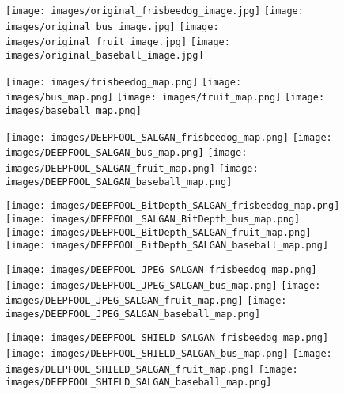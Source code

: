 \documentclass[10pt,twocolumn,letterpaper]{article}
\begin{document}
\begin{figure}[hbt]

\texttt{[image: images/original\_frisbeedog\_image.jpg]}
  \texttt{[image: images/original\_bus\_image.jpg]}
  \texttt{[image: images/original\_fruit\_image.jpg]}
  \texttt{[image: images/original\_baseball\_image.jpg]}
  
\texttt{[image: images/frisbeedog\_map.png]}
  \texttt{[image: images/bus\_map.png]}
  \texttt{[image: images/fruit\_map.png]}
  \texttt{[image: images/baseball\_map.png]}
  
\texttt{[image: images/DEEPFOOL\_SALGAN\_frisbeedog\_map.png]}
  \texttt{[image: images/DEEPFOOL\_SALGAN\_bus\_map.png]}
  \texttt{[image: images/DEEPFOOL\_SALGAN\_fruit\_map.png]}
  \texttt{[image: images/DEEPFOOL\_SALGAN\_baseball\_map.png]}
  
\texttt{[image: images/DEEPFOOL\_BitDepth\_SALGAN\_frisbeedog\_map.png]}
  \texttt{[image: images/DEEPFOOL\_SALGAN\_BitDepth\_bus\_map.png]}
  \texttt{[image: images/DEEPFOOL\_BitDepth\_SALGAN\_fruit\_map.png]}
  \texttt{[image: images/DEEPFOOL\_BitDepth\_SALGAN\_baseball\_map.png]}
  
\texttt{[image: images/DEEPFOOL\_JPEG\_SALGAN\_frisbeedog\_map.png]}
  \texttt{[image: images/DEEPFOOL\_JPEG\_SALGAN\_bus\_map.png]}
  \texttt{[image: images/DEEPFOOL\_JPEG\_SALGAN\_fruit\_map.png]}
  \texttt{[image: images/DEEPFOOL\_JPEG\_SALGAN\_baseball\_map.png]}
  
\texttt{[image: images/DEEPFOOL\_SHIELD\_SALGAN\_frisbeedog\_map.png]}
  \texttt{[image: images/DEEPFOOL\_SHIELD\_SALGAN\_bus\_map.png]}
  \texttt{[image: images/DEEPFOOL\_SHIELD\_SALGAN\_fruit\_map.png]}
  \texttt{[image: images/DEEPFOOL\_SHIELD\_SALGAN\_baseball\_map.png]}
  

\end{figure}
\end{document}
